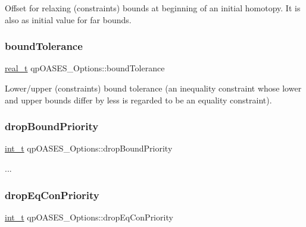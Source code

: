 Offset for relaxing (constraints\textquotesingle{}) bounds at beginning of an initial homotopy. It is also as initial value for far bounds. \mbox{\label{structqp_o_a_s_e_s___options_a2f3197e8b04dc36819376951b99794dc}} 
\subsubsection{\texorpdfstring{bound\+Tolerance}{boundTolerance}}
{\footnotesize\ttfamily \hyperlink{qp_o_a_s_e_s__wrapper_8h_a0d00e2b3dfadee81331bbb39068570c4}{real\+\_\+t} qp\+O\+A\+S\+E\+S\+\_\+\+Options\+::bound\+Tolerance}

Lower/upper (constraints\textquotesingle{}) bound tolerance (an inequality constraint whose lower and upper bounds differ by less is regarded to be an equality constraint). \mbox{\label{structqp_o_a_s_e_s___options_aa7fbe2d8d1e7a224e5e56120da09c17b}} 
\subsubsection{\texorpdfstring{drop\+Bound\+Priority}{dropBoundPriority}}
{\footnotesize\ttfamily \hyperlink{_types_8hpp_ab6fd6105e64ed14a0c9281326f05e623}{int\+\_\+t} qp\+O\+A\+S\+E\+S\+\_\+\+Options\+::drop\+Bound\+Priority}

... \mbox{\label{structqp_o_a_s_e_s___options_aef2d6f1515675a21d7b1f8849d44d303}} 
\subsubsection{\texorpdfstring{drop\+Eq\+Con\+Priority}{dropEqConPriority}}
{\footnotesize\ttfamily \hyperlink{_types_8hpp_ab6fd6105e64ed14a0c9281326f05e623}{int\+\_\+t} qp\+O\+A\+S\+E\+S\+\_\+\+Options\+::drop\+Eq\+Con\+Priority}


